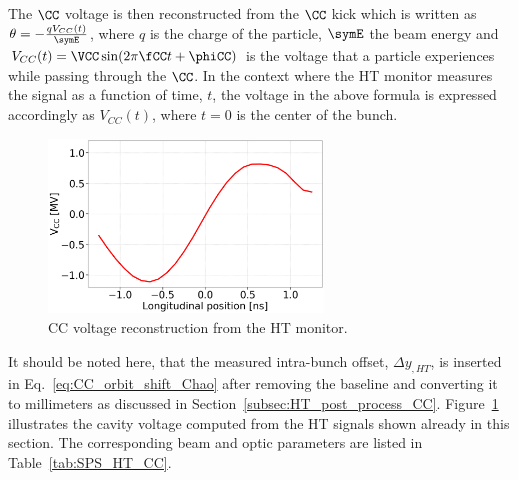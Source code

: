 The $\CC$ voltage is then reconstructed from the $\CC$ kick which is written as $\theta = - \frac{q V_{CC}(t)}{\symE}$, where $q$ is the charge of the particle, $\symE$ the beam energy and $V_{CC}(t) = \VCC \sin(2 \pi \fCC t + \phiCC) $ is the voltage that a particle experiences while passing through the $\CC$. In the context where the HT monitor measures the signal as a function of time, $t$, the voltage in the above formula is expressed accordingly as $V_{CC}(t)$, where $t=0$ is the center of the bunch.

\begin{figure}[!h]
\centering         
\includegraphics[width=0.65\textwidth]{images/Ch4/HT_VCC_callibration_20180530_135105_CC_post_processing.png}
    \caption{CC voltage reconstruction from the HT monitor.}
    \label{fig:VCC_from_HT_monitor_measurement}
\end{figure}

It should be noted here, that the measured intra-bunch offset, $\Delta y_{, HT}$, is inserted in Eq.~\eqref{eq:CC_orbit_shift_Chao} after removing the baseline and converting it to millimeters as discussed in Section~\ref{subsec:HT_post_process_CC}. Figure~\ref{fig:VCC_from_HT_monitor_measurement} illustrates the cavity voltage computed from the HT signals shown already in this section. The corresponding beam and optic parameters are listed in Table~\ref{tab:SPS_HT_CC}.

